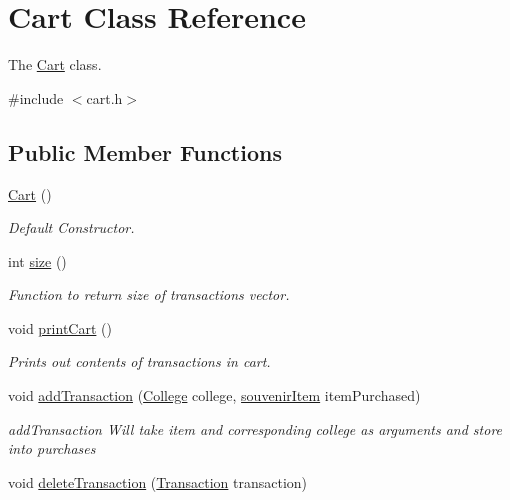 \hypertarget{class_cart}{}\section{Cart Class Reference}
\label{class_cart}


The \mbox{\hyperlink{class_cart}{Cart}} class.  




{\ttfamily \#include $<$cart.\+h$>$}

\subsection*{Public Member Functions}
\begin{DoxyCompactItemize}
\item 
\mbox{\label{class_cart_a596ee7e7ced21478d39b6afe67828a2b}} 
\mbox{\hyperlink{class_cart_a596ee7e7ced21478d39b6afe67828a2b}{Cart}} ()
\begin{DoxyCompactList}\small\item\em Default Constructor. \end{DoxyCompactList}\item 
int \mbox{\hyperlink{class_cart_ac89333c3766ab987cad13fc430407b78}{size}} ()
\begin{DoxyCompactList}\small\item\em Function to return size of transactions vector. \end{DoxyCompactList}\item 
void \mbox{\hyperlink{class_cart_aa85e6745516afcd9b46fac6397aa5439}{print\+Cart}} ()
\begin{DoxyCompactList}\small\item\em Prints out contents of transactions in cart. \end{DoxyCompactList}\item 
void \mbox{\hyperlink{class_cart_a751f19cb4df33a6a8c89f7e752cdb07d}{add\+Transaction}} (\mbox{\hyperlink{struct_college}{College}} college, \mbox{\hyperlink{structsouvenir_item}{souvenir\+Item}} item\+Purchased)
\begin{DoxyCompactList}\small\item\em add\+Transaction Will take item and corresponding college as arguments and store into purchases \end{DoxyCompactList}\item 
void \mbox{\hyperlink{class_cart_a82fa9a7a845f5fde8d88999a11159d27}{delete\+Transaction}} (\mbox{\hyperlink{class_transaction}{Transaction}} transaction)

\end{DoxyCompactItemize}
